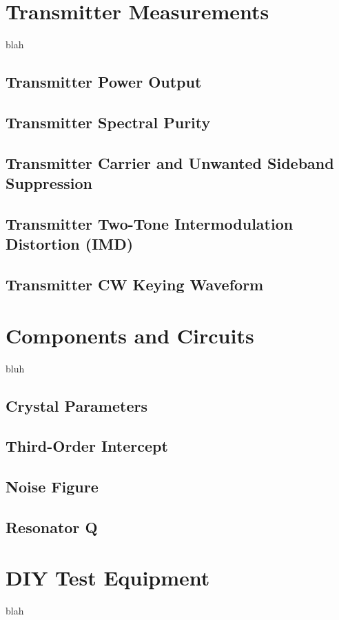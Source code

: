 \documentclass[10pt,letterpaper]{book}
\begin{document}
\chapter{Transmitter Measurements}
blah
\section{Transmitter Power Output}
\section{Transmitter Spectral Purity}
\section{Transmitter Carrier and Unwanted Sideband Suppression}
\section{Transmitter Two-Tone Intermodulation Distortion (IMD)}
\section{Transmitter CW Keying Waveform}
\chapter{Components and Circuits}
bluh
\section{Crystal Parameters}
\section{Third-Order Intercept}
\section{Noise Figure}
\section{Resonator Q}
\chapter{DIY Test Equipment}
blah
\end{document}
